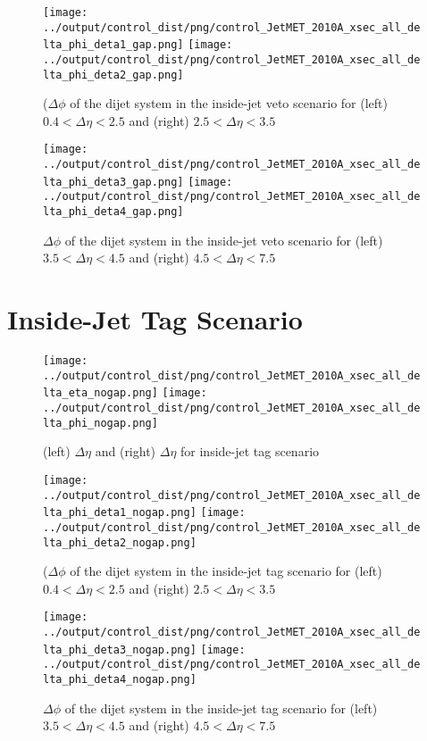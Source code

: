 \documentclass[11pt]{article}
\begin{document}
\begin{figure}[ht]
\centering
\texttt{[image: ../output/control\_dist/png/control\_JetMET\_2010A\_xsec\_all\_delta\_phi\_deta1\_gap.png]}
\texttt{[image: ../output/control\_dist/png/control\_JetMET\_2010A\_xsec\_all\_delta\_phi\_deta2\_gap.png]}
\caption{($\Delta\phi$ of the dijet system in the inside-jet veto scenario for (left) $0.4 < \Delta\eta < 2.5$ and (right) $2.5 < \Delta\eta < 3.5$}
\label{fig:delta_gap_deta1}
\end{figure}


\begin{figure}[ht]
\centering
\texttt{[image: ../output/control\_dist/png/control\_JetMET\_2010A\_xsec\_all\_delta\_phi\_deta3\_gap.png]}
\texttt{[image: ../output/control\_dist/png/control\_JetMET\_2010A\_xsec\_all\_delta\_phi\_deta4\_gap.png]}
\caption{$\Delta\phi$ of the dijet system in the inside-jet veto scenario for (left) $3.5 < \Delta\eta < 4.5$ and (right) $4.5 < \Delta\eta < 7.5$}
\label{fig:delta_gap_deta2}
\end{figure}

\clearpage


\section{Inside-Jet Tag Scenario}

\begin{figure}[ht]
\centering
\texttt{[image: ../output/control\_dist/png/control\_JetMET\_2010A\_xsec\_all\_delta\_eta\_nogap.png]}
\texttt{[image: ../output/control\_dist/png/control\_JetMET\_2010A\_xsec\_all\_delta\_phi\_nogap.png]}
\caption{(left) $\Delta\eta$ and (right) $\Delta\eta$ for inside-jet tag scenario}
\label{fig:delta_nogap}
\end{figure}


\begin{figure}[ht]
\centering
\texttt{[image: ../output/control\_dist/png/control\_JetMET\_2010A\_xsec\_all\_delta\_phi\_deta1\_nogap.png]}
\texttt{[image: ../output/control\_dist/png/control\_JetMET\_2010A\_xsec\_all\_delta\_phi\_deta2\_nogap.png]}
\caption{($\Delta\phi$ of the dijet system in the inside-jet tag scenario for (left) $0.4 < \Delta\eta < 2.5$ and (right) $2.5 < \Delta\eta < 3.5$}
\label{fig:delta_nogap_deta1}
\end{figure}


\begin{figure}[ht]
\centering
\texttt{[image: ../output/control\_dist/png/control\_JetMET\_2010A\_xsec\_all\_delta\_phi\_deta3\_nogap.png]}
\texttt{[image: ../output/control\_dist/png/control\_JetMET\_2010A\_xsec\_all\_delta\_phi\_deta4\_nogap.png]}
\caption{$\Delta\phi$ of the dijet system in the inside-jet tag scenario for (left) $3.5 < \Delta\eta < 4.5$ and (right) $4.5 < \Delta\eta < 7.5$}
\label{fig:delta_nogap_deta2}
\end{figure}
\end{document}
